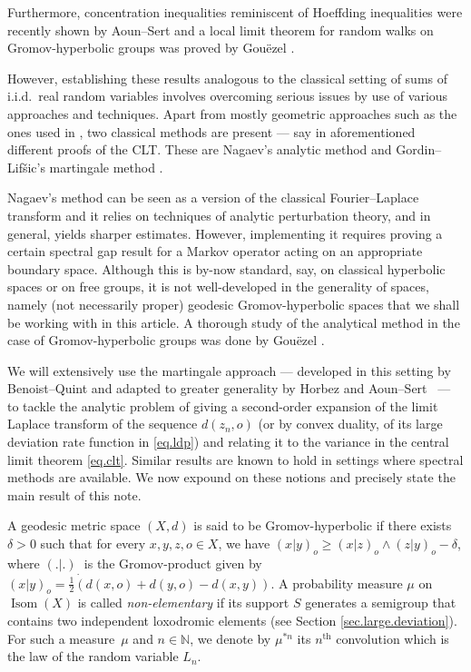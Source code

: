 \documentclass[10pt]{amsart}
\theoremstyle{plain}
\theoremstyle{definition}
\newcommand\N{\mathbb{N}}
\DeclareMathOperator\Isom{Isom}
\begin{document}
Furthermore, concentration inequalities reminiscent of Hoeffding inequalities were recently shown by Aoun--Sert \cite{aoun-sert} and a local limit theorem for random walks on Gromov-hyperbolic groups was proved by Gouëzel \cite{gouezel.local}.

However, establishing these results analogous to the classical setting of sums of i.i.d.~real random variables involves overcoming serious issues by use of various approaches and techniques. Apart from mostly geometric approaches such as the ones used in \cite{BMSS,gouezel.first.moment,mathieu-sisto}, two classical methods are present --- say in aforementioned different proofs of the CLT. These are Nagaev's analytic method \cite{nagaev} and Gordin--Lif\v{s}ic's martingale method \cite{martingale.method}.

Nagaev's method can be seen as a version of the classical Fourier--Laplace transform and it relies on techniques of analytic perturbation theory, and in general, yields sharper estimates. However, implementing it requires proving a certain spectral gap result for a Markov operator acting on an appropriate boundary space. Although this is by-now standard, say, on classical hyperbolic spaces or on free groups, it is not well-developed in the generality of spaces, namely (not necessarily proper) geodesic Gromov-hyperbolic spaces that we shall be working with in this article. A thorough study of the analytical method in the case of Gromov-hyperbolic groups was done by Gouëzel \cite[Prop.\,3.6, \S 5]{gouezel.gap}.

We will extensively use the martingale approach --- developed in this setting by Benoist--Quint \cite{BQ.CLT, BQ.hyperbolic} and adapted to greater generality by Horbez \cite{horbez} and Aoun--Sert~\cite{aoun-sert} --- to tackle the analytic problem of giving a second-order expansion of the limit Laplace transform of the sequence $d(z_n,o)$ (or by convex duality, of its large deviation rate function in \eqref{eq.ldp}) and relating it to the variance in the central limit theorem \eqref{eq.clt}. Similar results are known to hold in settings where spectral methods are available. We now expound on these notions and precisely state the main result of this note.

A geodesic metric space $(X,d)$ is said to be Gromov-hyperbolic if there exists $\delta>0$ such that for every $x,y,z,o \in X$, we have $(x|y)_o \geq (x|z)_o \wedge (z|y)_o -\delta$, where $(.|.)_.$ is the Gromov-product given by $(x|y)_o=\frac{1}{2}(d(x,o)+d(y,o)-d(x,y))$. A probability measure $\mu$ on $\Isom(X)$ is called \textit{non-elementary} if its support $S$ generates a semigroup that contains two independent loxodromic elements (see Section \ref{sec.large.deviation}). For such a measure~$\mu$ and $n \in \N$, we denote by $\mu^{\ast n}$ its $n^\mathrm{th}$ convolution which is the law of the random variable $L_n$.
\end{document}

